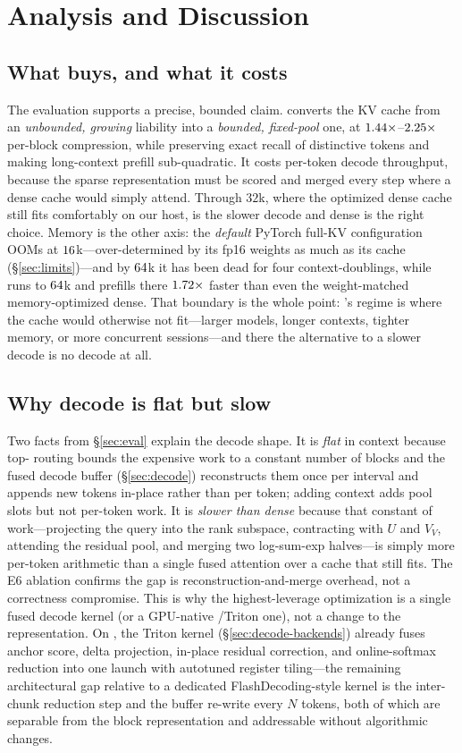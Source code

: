 \section{Analysis and Discussion}
\label{sec:analysis}

\subsection{What \dkv{} buys, and what it costs}
The evaluation supports a precise, bounded claim. \dkv{} converts the KV cache from an
\emph{unbounded, growing} liability into a \emph{bounded, fixed-pool} one, at
$1.44\times$--$2.25\times$ per-block compression, while preserving exact recall of
distinctive tokens and making long-context prefill sub-quadratic. It costs per-token decode
throughput, because the sparse representation must be scored and merged every step where a dense
cache would simply attend. Through $32$k, where the optimized dense cache still fits comfortably on
our host, \dkv{} is the slower decode and dense is the right choice. Memory is the other axis: the
\emph{default} PyTorch full-KV configuration OOMs at $16$k---over-determined by its fp16 weights
as much as its cache (\S\ref{sec:limits})---and by $64$k it has been dead for four
context-doublings, while \dkv{} runs to $64$k and prefills there
$1.72\times$ faster than even the weight-matched memory-optimized dense. That boundary is the whole
point: \dkv{}'s regime is where the cache would otherwise not fit---larger models, longer
contexts, tighter memory, or more concurrent sessions---and there the alternative to a slower
decode is no decode at all.

\subsection{Why decode is flat but slow}
Two facts from \S\ref{sec:eval} explain the decode shape. It is \emph{flat} in context because
top-\topk{} routing bounds the expensive work to a constant number of blocks and the fused
decode buffer (\S\ref{sec:decode}) reconstructs them once per interval and appends new tokens
in-place rather than per token; adding context adds pool slots but not per-token work. It is
\emph{slower than dense} because that constant of work---projecting the query into the rank
subspace, contracting with $U$ and $V_V$, attending the residual pool, and merging two
log-sum-exp halves---is simply more per-token arithmetic than a single fused attention over a
cache that still fits. The E6 ablation confirms the gap is reconstruction-and-merge overhead,
not a correctness compromise. This is why the highest-leverage optimization is a single fused
decode kernel (or a GPU-native \cuda{}/Triton one), not a change to the representation. On
\cuda{}, the Triton kernel (\S\ref{sec:decode-backends}) already fuses anchor score, delta
projection, in-place residual correction, and online-softmax reduction into one launch with
autotuned register tiling---the remaining architectural gap relative to a dedicated
FlashDecoding-style kernel is the inter-chunk reduction step and the buffer re-write every
$N$ tokens, both of which are separable from the block representation and addressable
without algorithmic changes.

